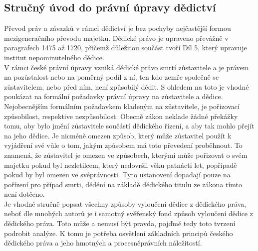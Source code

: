 \documentclass{article}
\begin{document}

\subsection{Stručný úvod do právní úpravy dědictví}

Převod práv a závazků v rámci dědictví je bez pochyby nejčastější formou mezigeneračního převodu majetku. Dědické právo je upraveno převážně v paragrafech 1475 až 1720, přičemž důležitou součást tvoří Díl 5, který upravuje institut nepominutelného dědice.\\

V rámci české právní úpravy vzniká dědické právo smrtí zůstavitele a je právem na pozůstalost nebo na poměrný podíl z ní, ten kdo zemře společně se zůstavitelem, nebo před ním, není způsobilý dědit. S ohledem na toto je vhodné poukázat na formální požadavky právní úpravy na zůstavitele a dědice. Nejobecnějším formálním požadavkem kladeným na zůstavitele, je pořizovací způsobilost, respektive nezpůsobilost. Obecně zákon neklade žádné překážky tomu, aby bylo jmění zůstavitele součástí dědického řízení, a aby tak mohlo přejít na jeho dědice. Je nicméně omezen způsob, který může zůstavitel použít k vyjádření své vůle o tom, jakým způsobem má toto převedení proběhnout. To znamená, že zůstavitel je omezen ve způsobech, kterými může pořizovat o svém majetku pokud byl nezletilcem, který nedovršil věku patnácti let, popřípadě pokud by byl omezen ve svéprávnosti. Tyto ustanovení dopadají pouze na pořízení pro případ smrti, dědění na základě dědického titulu ze zákona tímto není dotčeno. \\

Je vhodné stručně popsat všechny způsoby vyloučení dědice z dědického práva, neboť dle mnohých autorů je i samotný svěřenský fond způsob vyloučení dědice z dědického práva. Toto může a nemusí být pravda, pojďmě tedy toto tvrzení podrobit analýze. K tomu je potřeba osvětlení základních principů českého dědického práva a jeho hmotných a procesněprávních náležitostí.\\
\end{document}

